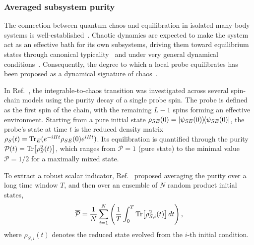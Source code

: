 \documentclass[letterpaper,superscriptaddress,aps,pra,nolongbibliography,showpacs,floatfix,dvipsnames,10pt,twocolumn]{revtex4-2}
\newcommand{\jami}{Choi-Jamiołkowski}
\begin{document}
\subsubsection{Averaged subsystem purity}\label{sec:avg_P}
The connection between quantum chaos and equilibration in isolated
many-body systems is well-established~\cite{deutsch_1991_quantum,
srednicki_1994_chaos,rigol_2008_thermalization,gogolin_2016_equilibration}.
Chaotic dynamics are expected to make the system act as an effective bath 
for its own subsystems, driving them toward equilibrium states
through canonical typicality~\cite{goldstein_2006_canonical} and under
very general dynamical conditions~\cite{reimann_2008_foundation}. 
Consequently, the degree to which a local probe equilibrates has been 
proposed as a dynamical signature of chaos~\cite{mirkin_2021_quantum}.

In Ref.~\cite{mirkin_2021_quantum}, the integrable-to-chaos transition 
was investigated across several spin-chain models using the purity 
decay of a single probe spin.
The probe is defined as the first spin of the chain, with the remaining
$L-1$ spins forming an effective environment. Starting from a pure
initial state $\rho_{SE}(0)=\dyad{\psi_{SE}(0)}$, the probe's state at
time $t$ is the reduced density matrix 
$\rho_S(t)=\Tr_E(e^{-iHt}\rho_{SE}(0)e^{iHt})$.
Its equilibration is quantified through the purity
$\mathcal{P}(t)=\Tr[\rho_S^2(t)]$, which ranges from $\mathcal{P}=1$
(pure state) to the minimal value $\mathcal{P}=1/2$ for a maximally
mixed state.

To extract a robust scalar indicator, Ref.~\cite{mirkin_2021_quantum}
proposed averaging the purity over a long time
window $T$, and then over
an ensemble of $N$ random product initial states,
\begin{equation}\label{eq:avg:P}
\overline{\mathcal{P}}=\frac{1}{N}\sum_{i=1}^N
\left(\frac{1}{T}\int_0^T \Tr[\rho_{S,i}^2(t)]\,dt\right),
\end{equation}
where $\rho_{S,i}(t)$ denotes the reduced state evolved from the $i$-th
initial condition.
\end{document}
